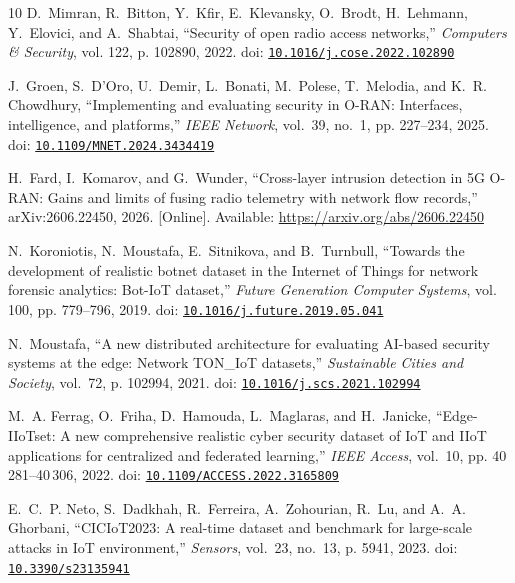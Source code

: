 \begin{thebibliography}{10}
D.~Mimran, R.~Bitton, Y.~Kfir, E.~Klevansky, O.~Brodt, H.~Lehmann, Y.~Elovici,
  and A.~Shabtai, ``Security of open radio access networks,'' \emph{Computers
  \& Security}, vol. 122, p. 102890, 2022. doi:
  \href{https://doi.org/10.1016/j.cose.2022.102890}{\nolinkurl{10.1016/j.cose.2022.102890}}

J.~Groen, S.~D'Oro, U.~Demir, L.~Bonati, M.~Polese, T.~Melodia, and K.~R.
  Chowdhury, ``Implementing and evaluating security in {O-RAN}: Interfaces,
  intelligence, and platforms,'' \emph{IEEE Network}, vol.~39, no.~1, pp.
  227--234, 2025. doi:
  \href{https://doi.org/10.1109/MNET.2024.3434419}{\nolinkurl{10.1109/MNET.2024.3434419}}

\BIBentryALTinterwordspacing
H.~Fard, I.~Komarov, and G.~Wunder, ``Cross-layer intrusion detection in {5G}
  {O-RAN}: Gains and limits of fusing radio telemetry with network flow
  records,'' arXiv:2606.22450, 2026. [Online]. Available:
  \url{https://arxiv.org/abs/2606.22450}
\BIBentrySTDinterwordspacing

N.~Koroniotis, N.~Moustafa, E.~Sitnikova, and B.~Turnbull, ``Towards the
  development of realistic botnet dataset in the {Internet of Things} for
  network forensic analytics: {Bot-IoT} dataset,'' \emph{Future Generation
  Computer Systems}, vol. 100, pp. 779--796, 2019. doi:
  \href{https://doi.org/10.1016/j.future.2019.05.041}{\nolinkurl{10.1016/j.future.2019.05.041}}

N.~Moustafa, ``A new distributed architecture for evaluating {AI}-based
  security systems at the edge: Network {TON\_IoT} datasets,''
  \emph{Sustainable Cities and Society}, vol.~72, p. 102994, 2021. doi:
  \href{https://doi.org/10.1016/j.scs.2021.102994}{\nolinkurl{10.1016/j.scs.2021.102994}}

M.~A. Ferrag, O.~Friha, D.~Hamouda, L.~Maglaras, and H.~Janicke,
  ``{Edge-IIoTset}: A new comprehensive realistic cyber security dataset of
  {IoT} and {IIoT} applications for centralized and federated learning,''
  \emph{IEEE Access}, vol.~10, pp. 40\,281--40\,306, 2022. doi:
  \href{https://doi.org/10.1109/ACCESS.2022.3165809}{\nolinkurl{10.1109/ACCESS.2022.3165809}}

E.~C.~P. Neto, S.~Dadkhah, R.~Ferreira, A.~Zohourian, R.~Lu, and A.~A.
  Ghorbani, ``{CICIoT2023}: A real-time dataset and benchmark for large-scale
  attacks in {IoT} environment,'' \emph{Sensors}, vol.~23, no.~13, p. 5941,
  2023. doi:
  \href{https://doi.org/10.3390/s23135941}{\nolinkurl{10.3390/s23135941}}


\end{thebibliography}
